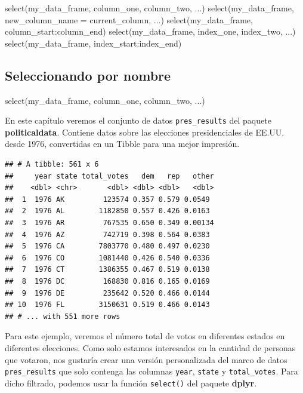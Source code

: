 \documentclass[
]{book}
\newenvironment{Shaded}{\begin{snugshade}}{\end{snugshade}}
\newcommand{\AttributeTok}[1]{\textcolor[rgb]{0.77,0.63,0.00}{#1}}
\newcommand{\FunctionTok}[1]{\textcolor[rgb]{0.00,0.00,0.00}{#1}}
\newcommand{\NormalTok}[1]{#1}
\newcommand{\SpecialCharTok}[1]{\textcolor[rgb]{0.00,0.00,0.00}{#1}}
\begin{document}
\begin{Shaded}
\begin{Highlighting}[]
\FunctionTok{select}\NormalTok{(my\_data\_frame, column\_one, column\_two, ...)}
\FunctionTok{select}\NormalTok{(my\_data\_frame, }\AttributeTok{new\_column\_name =}\NormalTok{ current\_column, ...)}
\FunctionTok{select}\NormalTok{(my\_data\_frame, column\_start}\SpecialCharTok{:}\NormalTok{column\_end)}
\FunctionTok{select}\NormalTok{(my\_data\_frame, index\_one, index\_two, ...)}
\FunctionTok{select}\NormalTok{(my\_data\_frame, index\_start}\SpecialCharTok{:}\NormalTok{index\_end)}
\end{Highlighting}
\end{Shaded}

\hypertarget{seleccionando-por-nombre}{%
\subsection{Seleccionando por nombre}\label{seleccionando-por-nombre}}

\begin{Shaded}
\begin{Highlighting}[]
\FunctionTok{select}\NormalTok{(my\_data\_frame, column\_one, column\_two, ...)}
\end{Highlighting}
\end{Shaded}

En este capítulo veremos el conjunto de datos \texttt{pres\_results} del paquete \textbf{politicaldata}. Contiene datos sobre las elecciones presidenciales de EE.UU. desde 1976, convertidas en un Tibble para una mejor impresión.

\begin{verbatim}
## # A tibble: 561 x 6
##     year state total_votes   dem   rep   other
##    <dbl> <chr>       <dbl> <dbl> <dbl>   <dbl>
##  1  1976 AK         123574 0.357 0.579 0.0549 
##  2  1976 AL        1182850 0.557 0.426 0.0163 
##  3  1976 AR         767535 0.650 0.349 0.00134
##  4  1976 AZ         742719 0.398 0.564 0.0383 
##  5  1976 CA        7803770 0.480 0.497 0.0230 
##  6  1976 CO        1081440 0.426 0.540 0.0336 
##  7  1976 CT        1386355 0.467 0.519 0.0138 
##  8  1976 DC         168830 0.816 0.165 0.0169 
##  9  1976 DE         235642 0.520 0.466 0.0144 
## 10  1976 FL        3150631 0.519 0.466 0.0143 
## # ... with 551 more rows
\end{verbatim}

Para este ejemplo, veremos el número total de votos en diferentes estados en diferentes elecciones. Como solo estamos interesados en la cantidad de personas que votaron, nos gustaría crear una versión personalizada del marco de datos \texttt{pres\_results} que solo contenga las columnas \texttt{year}, \texttt{state} y \texttt{total\_votes}. Para dicho filtrado, podemos usar la función \texttt{select()} del paquete \textbf{dplyr}.
\end{document}

